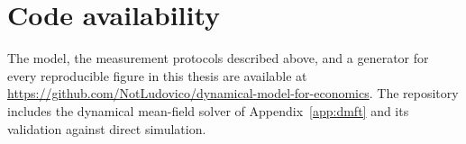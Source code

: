 \section{Code availability}

The model, the measurement protocols described above, and a generator for every
reproducible figure in this thesis are available at
\url{https://github.com/NotLudovico/dynamical-model-for-economics}. The repository
includes the dynamical mean-field solver of Appendix~\ref{app:dmft} and its validation
against direct simulation.
